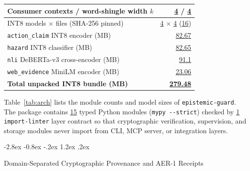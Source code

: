 \documentclass[10pt,twocolumn]{article}
\makeatletter
\renewcommand\subsection{\@startsection{subsection}{2}{\z@}%
  {-2.8ex \@plus -0.8ex \@minus -.2ex}%
  {1.2ex \@plus .2ex}%
  {\normalfont\large\bfseries\raggedright}}
\makeatother
\begin{document}
\begin{table}[t]
\begin{tabularx}{\columnwidth}{@{}>{\raggedright\arraybackslash}Xr@{}}
Consumer contexts / word-shingle width $k$ & \href{https://github.com/AlienatedAliens/epistemic-guard/blob/v0.5.2/results/table1_architecture.json\#L2}{4} / \href{https://github.com/AlienatedAliens/epistemic-guard/blob/v0.5.2/results/table1_architecture.json\#L29}{4} \\
\midrule
INT8 models $\times$ files (SHA-256 pinned) & \href{https://github.com/AlienatedAliens/epistemic-guard/blob/v0.5.2/results/table1_architecture.json\#L16}{4} $\times$ \href{https://github.com/AlienatedAliens/epistemic-guard/blob/v0.5.2/results/table1_architecture.json\#L12}{4} (\href{https://github.com/AlienatedAliens/epistemic-guard/blob/v0.5.2/results/table1_architecture.json\#L25}{16}) \\
\quad \texttt{action\_claim} INT8 encoder (MB) & \href{https://github.com/AlienatedAliens/epistemic-guard/blob/v0.5.2/results/table1_architecture.json\#L19}{82.67} \\
\quad \texttt{hazard} INT8 classifier (MB) & \href{https://github.com/AlienatedAliens/epistemic-guard/blob/v0.5.2/results/table1_architecture.json\#L20}{82.65} \\
\quad \texttt{nli} DeBERTa-v3 cross-encoder (MB) & \href{https://github.com/AlienatedAliens/epistemic-guard/blob/v0.5.2/results/table1_architecture.json\#L21}{91.1} \\
\quad \texttt{web\_evidence} MiniLM encoder (MB) & \href{https://github.com/AlienatedAliens/epistemic-guard/blob/v0.5.2/results/table1_architecture.json\#L22}{23.06} \\
\textbf{Total unpacked INT8 bundle (MB)} & \textbf{\href{https://github.com/AlienatedAliens/epistemic-guard/blob/v0.5.2/results/table1_architecture.json\#L34}{279.48}} \\
\bottomrule
\end{tabularx}
\end{table}

Table~\ref{tab:arch} lists the module counts and model sizes of \texttt{epistemic-guard}. The package contains \href{https://github.com/AlienatedAliens/epistemic-guard/blob/v0.5.2/results/table1_architecture.json\#L30}{15} typed Python modules (\texttt{mypy -{-}strict}) checked by \href{https://github.com/AlienatedAliens/epistemic-guard/blob/v0.5.2/results/table1_architecture.json\#L15}{1} \texttt{import-linter} layer contract so that cryptographic verification, supervision, and storage modules never import from CLI, MCP server, or integration layers.

\subsection{Domain-Separated Cryptographic Provenance and AER-1 Receipts}
\label{sec:crypto}
\end{document}
